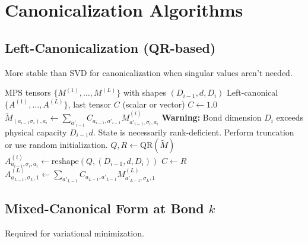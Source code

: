 \documentclass[aps,prb,onecolumn,scriptaddress]{revtex4-2}
\begin{document}
	
	\section{Canonicalization Algorithms}
	
	\subsection{Left-Canonicalization (QR-based)}
	More stable than SVD for canonicalization when singular values aren't needed.
	
\begin{algorithm}[H]
	\caption{LeftCanonicalize (Numerically Stable)}
	\begin{algorithmic}[1]
		\Require MPS tensors $\{M^{(1)}, \dots, M^{(L)}\}$ with shapes $(D_{i-1}, d, D_i)$
		\Ensure Left-canonical $\{A^{(1)}, \dots, A^{(L)}\}$, last tensor $C$ (scalar or vector)
		\State $C \gets 1.0$ 
		\State {}
		\State $\tilde{M}_{(a_{i-1}\sigma_i), a_i} \gets \sum_{a'_{i-1}} C_{a_{i-1}, a'_{i-1}} M^{(i)}_{a'_{i-1}, \sigma_i, a_i}$ 
		\State {}
		\State {}
		\State {}
		\State \textbf{Warning:} Bond dimension $D_i$ exceeds physical capacity $D_{i-1}d$. 
		\State {} State is necessarily rank-deficient. Perform truncation or use random initialization.
		\EndIf
		\State $Q, R \gets \text{QR}(\tilde{M})$ 
		\State $A^{(i)}_{a_{i-1}, \sigma_i, a_i} \gets \text{reshape}(Q, (D_{i-1}, d, D_i))$
		\State $C \gets R$ 
		\EndFor
		\State {}
		\State $A^{(L)}_{a_{L-1}, \sigma_L, 1} \gets \sum_{a'_{L-1}} C_{a_{L-1}, a'_{L-1}} M^{(L)}_{a'_{L-1}, \sigma_L, 1}$ 
	\end{algorithmic}
\end{algorithm}

	
	\subsection{Mixed-Canonical Form at Bond $k$}
	Required for variational minimization.
	
\end{document}
